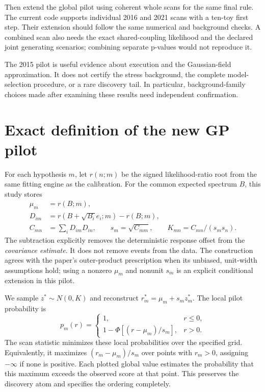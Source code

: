 \documentclass[11pt]{article}
\begin{document}
Then extend the global pilot using coherent whole scans for the same final rule. The current code supports individual 2016 and 2021 scans with a ten-toy first step. Their extension should follow the same numerical and background checks. A combined scan also needs the exact shared-coupling likelihood and the declared joint generating scenarios; combining separate p-values would not reproduce it.

The 2015 pilot is useful evidence about execution and the Gaussian-field approximation. It does not certify the stress background, the complete model-selection procedure, or a rare discovery tail. In particular, background-family choices made after examining these results need independent confirmation.

\begin{center}
\end{center}

\appendix
\clearpage
\section{Exact definition of the new GP pilot}
For each hypothesis $m$, let $r(n;m)$ be the signed likelihood-ratio root from the same fitting engine as the calibration. For the common expected spectrum $B$, this study stores
\begin{align}
 \mu_m &= r(B;m),\\
 D_{im} &= r(B+\sqrt{B_i}e_i;m)-r(B;m),\\
 C_{mn} &= \sum_i D_{im}D_{in},\qquad
 s_m=\sqrt{C_{mm}},\qquad K_{mn}=C_{mn}/(s_ms_n).
\end{align}
The subtraction explicitly removes the deterministic response offset from the \emph{covariance estimate}. It does not remove events from the data. The construction agrees with the paper's outer-product prescription when its unbiased, unit-width assumptions hold; using a nonzero $\mu_m$ and nonunit $s_m$ is an explicit conditional extension in this pilot.

We sample $z^*\sim N(0,K)$ and reconstruct $r_m^*=\mu_m+s_mz_m^*$. The local pilot probability is
\begin{equation}
 p_m(r)=\begin{cases}1,&r\leq0,\\1-\Phi[(r-\mu_m)/s_m],&r>0.\end{cases}
\end{equation}
The scan statistic minimizes these local probabilities over the specified grid. Equivalently, it maximizes $(r_m-\mu_m)/s_m$ over points with $r_m>0$, assigning $-\infty$ if none is positive. Each plotted global value estimates the probability that this maximum exceeds the observed score at that point. This preserves the discovery atom and specifies the ordering completely.
\end{document}
